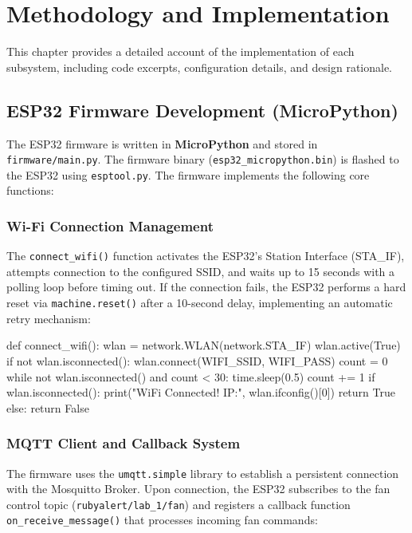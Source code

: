 \documentclass[12pt,a4paper]{report}
\begin{document}
\chapter{Methodology and Implementation}
\label{ch:methodology}

This chapter provides a detailed account of the implementation of each subsystem, including code excerpts, configuration details, and design rationale.

\section{ESP32 Firmware Development (MicroPython)}
The ESP32 firmware is written in \textbf{MicroPython} and stored in \texttt{firmware/main.py}. The firmware binary (\texttt{esp32\_micropython.bin}) is flashed to the ESP32 using \texttt{esptool.py}. The firmware implements the following core functions:

\subsection{Wi-Fi Connection Management}
The \texttt{connect\_wifi()} function activates the ESP32's Station Interface (STA\_IF), attempts connection to the configured SSID, and waits up to 15 seconds with a polling loop before timing out. If the connection fails, the ESP32 performs a hard reset via \texttt{machine.reset()} after a 10-second delay, implementing an automatic retry mechanism:

\begin{codebox}[Python]
def connect_wifi():
    wlan = network.WLAN(network.STA_IF)
    wlan.active(True)
    if not wlan.isconnected():
        wlan.connect(WIFI_SSID, WIFI_PASS)
        count = 0
        while not wlan.isconnected() and count < 30:
            time.sleep(0.5)
            count += 1
    if wlan.isconnected():
        print("WiFi Connected! IP:", wlan.ifconfig()[0])
        return True
    else:
        return False
\end{codebox}

\subsection{MQTT Client and Callback System}
The firmware uses the \texttt{umqtt.simple} library to establish a persistent connection with the Mosquitto Broker. Upon connection, the ESP32 subscribes to the fan control topic (\texttt{rubyalert/lab\_1/fan}) and registers a callback function \texttt{on\_receive\_message()} that processes incoming fan commands:
\end{document}
